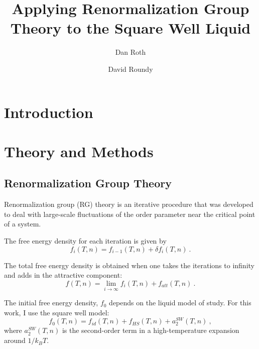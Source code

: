 \documentclass[letterpaper,twocolumn,amsmath,amssymb,prb]{revtex4-1}
\newcommand{\kt}{k_BT}
\begin{document}
\title{Applying Renormalization Group Theory to the Square Well Liquid}

\author{Dan Roth}

\author{David Roundy}

\begin{abstract}
{}

\end{abstract}

\maketitle

\section{Introduction}

\section{Theory and Methods}

\subsection{Renormalization Group Theory}
Renormalization group (RG) theory is an iterative procedure that was
developed to deal with large-scale fluctuations of the order parameter
near the critical point of a system.

The free energy density for each iteration is given by
\[
  f_i(T,n) = f_{i-1}(T,n) + \delta f_i(T,n)\ .
\]

The total free energy density is obtained when one takes the
iterations to infinity and adds in the attractive component:
\[
  f(T,n) = \lim_{i \to \infty} f_i(T,n) + f_{att}(T,n)\ .
\]

The initial free energy density, $f_0$ depends on the liquid model of study. For this work, I use the square well model:
\[
  f_0(T,n) = f_{id}(T,n) + f_{HS}(T,n) + a_2^{SW}(T,n)\ ,
\]
where $a_2^{SW}(T,n)$ is the second-order term in a high-temperature expansion around $1/\kt$.~\cite{Gil-Villegas97}
\end{document}
